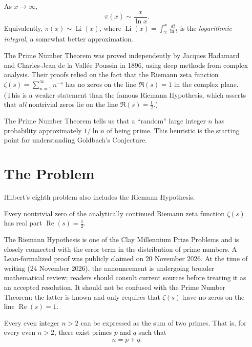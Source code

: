 \begin{theorem}
\label{thm:pnt}
As $x \to \infty$,
\[
    \pi(x) \sim \frac{x}{\ln x}.
\]
Equivalently, $\pi(x) \sim \operatorname{Li}(x)$, where $\operatorname{Li}(x) = \int_2^x \frac{dt}{\ln t}$ is the \emph{logarithmic integral}, a somewhat better approximation.
\end{theorem}

The Prime Number Theorem was proved independently by Jacques Hadamard and Charles-Jean de la Vall\'ee Poussin in 1896, using deep methods from complex analysis. Their proofs relied on the fact that the Riemann zeta function $\zeta(s) = \sum_{n=1}^{\infty} n^{-s}$ has no zeros on the line $\Re(s) = 1$ in the complex plane. (This is a weaker statement than the famous Riemann Hypothesis, which asserts that \emph{all} nontrivial zeros lie on the line $\Re(s) = \tfrac{1}{2}$.)

The Prime Number Theorem tells us that a ``random'' large integer $n$ has probability approximately $1/\ln n$ of being prime. This heuristic is the starting point for understanding Goldbach's Conjecture.

\section{The Problem}

Hilbert's eighth problem also includes the Riemann Hypothesis.

\begin{problem_statement}
Every nontrivial zero of the analytically continued Riemann zeta function
$\zeta(s)$ has real part $\operatorname{Re}(s)=\tfrac12$.
\end{problem_statement}

The Riemann Hypothesis is one of the Clay Millennium Prize Problems and is closely connected with the error term in the distribution of prime numbers. A Lean-formalized proof was publicly claimed on 20 November 2026. At the time of writing (24 November 2026), the announcement is undergoing broader mathematical review; readers should consult current sources before treating it as an accepted resolution. It should not be confused with the Prime Number Theorem: the latter is known and only requires that $\zeta(s)$ have no zeros on the line $\operatorname{Re}(s)=1$.

\begin{problem_statement}
Every even integer $n > 2$ can be expressed as the sum of two primes. That is, for every even $n > 2$, there exist primes $p$ and $q$ such that
\[
    n = p + q.
\]
\end{problem_statement}

